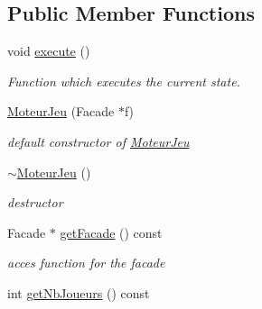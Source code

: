 \subsection*{Public Member Functions}
\begin{DoxyCompactItemize}
\item 
void \hyperlink{class_moteur_jeu_a1b3da5ce343d467b8f31c373a608a5ab}{execute} ()
\begin{DoxyCompactList}\small\item\em Function which executes the current state. \item\end{DoxyCompactList}\item 
\hyperlink{class_moteur_jeu_a0537d1dad0601669f09a7f8fd7d6db9c}{MoteurJeu} (Facade $\ast$f)
\begin{DoxyCompactList}\small\item\em default constructor of \hyperlink{class_moteur_jeu}{MoteurJeu} \item\end{DoxyCompactList}\item 
\hypertarget{class_moteur_jeu_a9651e5302c48ec31820ec3664a0d1eff}{
\hyperlink{class_moteur_jeu_a9651e5302c48ec31820ec3664a0d1eff}{$\sim$MoteurJeu} ()}
\label{class_moteur_jeu_a9651e5302c48ec31820ec3664a0d1eff}

\begin{DoxyCompactList}\small\item\em destructor \item\end{DoxyCompactList}\item 
Facade $\ast$ \hyperlink{class_moteur_jeu_aa123f6cbd22f11bd3e1039945335b21f}{getFacade} () const 
\begin{DoxyCompactList}\small\item\em acces function for the facade \item\end{DoxyCompactList}\item 
\hypertarget{class_moteur_jeu_a484018f5752b543246199f46993bfb32}{
int \hyperlink{class_moteur_jeu_a484018f5752b543246199f46993bfb32}{getNbJoueurs} () const }
\label{class_moteur_jeu_a484018f5752b543246199f46993bfb32}


\end{DoxyCompactItemize}
